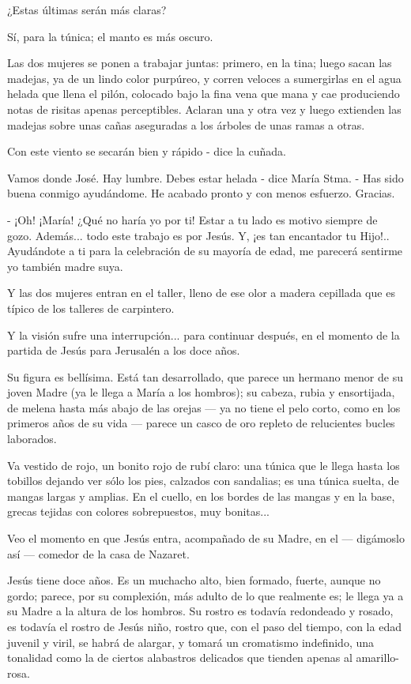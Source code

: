\documentclass[12pt]{book} %
\begin{document}
¿Estas últimas serán más claras? 

Sí, para la túnica; el manto es más oscuro. 

Las dos mujeres se ponen a trabajar juntas: primero, en la tina; luego sacan las madejas, ya de un lindo color purpúreo, y corren veloces a sumergirlas en el agua helada que llena el pilón, colocado bajo la fina vena que mana y cae produciendo notas de risitas apenas perceptibles. Aclaran una y otra vez y luego extienden las madejas sobre unas cañas aseguradas a los árboles de unas ramas a otras. 

Con este viento se secarán bien y rápido - dice la cuñada. 

Vamos donde José. Hay lumbre. Debes estar helada - dice María Stma. - Has sido buena conmigo ayudándome. He acabado pronto y con menos esfuerzo. Gracias. 

- ¡Oh! ¡María! ¿Qué no haría yo por ti! Estar a tu lado es motivo siempre de gozo. Además... todo este trabajo es por Jesús. Y, ¡es tan encantador tu Hijo!.. Ayudándote a ti para la celebración de su mayoría de edad, me parecerá sentirme yo también madre suya. 

Y las dos mujeres entran en el taller, lleno de ese olor a madera cepillada que es típico de los talleres de carpintero. 

Y la visión sufre una interrupción... para continuar después, en el momento de la partida de Jesús para Jerusalén a los doce años. 

Su figura es bellísima. Está tan desarrollado, que parece un hermano menor de su joven Madre (ya le llega a María a los hombros); su cabeza, rubia y ensortijada, de melena hasta más abajo de las orejas — ya no tiene el pelo corto, como en los primeros años de su vida — parece un casco de oro repleto de relucientes bucles laborados. 

Va vestido de rojo, un bonito rojo de rubí claro: una túnica que le llega hasta los tobillos dejando ver sólo los pies, calzados con sandalias; es una túnica suelta, de mangas largas y amplias. En el cuello, en los bordes de las mangas y en la base, grecas tejidas con colores sobrepuestos, muy bonitas... 

Veo el momento en que Jesús entra, acompañado de su Madre, en el — digámoslo así — comedor de la casa de Nazaret. 

Jesús tiene doce años. Es un muchacho alto, bien formado, fuerte, aunque no gordo; parece, por su complexión, más adulto de lo que realmente es; le llega ya a su Madre a la altura de los hombros. Su rostro es todavía redondeado y rosado, es todavía el rostro de Jesús niño, rostro que, con el paso del tiempo, con la edad juvenil y viril, se habrá de alargar, y tomará un cromatismo indefinido, una tonalidad como la de ciertos alabastros delicados que tienden apenas al amarillo- rosa. 
\end{document}
